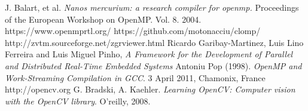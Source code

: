 \documentclass[a4paper,12pt,oneside]{book}
\begin{document}
\begin{thebibliography}{30}
 J. Balart, et al. \emph{Nanos mercurium: a research compiler for openmp.} Proceedings of the European Workshop on OpenMP. Vol. 8. 2004.
https://www.openmprtl.org/
https://github.com/motonacciu/clomp/
http://zvtm.sourceforge.net/zgrviewer.html
 Ricardo Garibay-Martinez, Luis Lino Ferreira and Luis Miguel Pinho, \emph{A Framework for the Development of Parallel and Distributed Real-Time Embedded Systems}
Antoniu Pop (1998). \emph{OpenMP and Work-Streaming Compilation in GCC}. 3 April 2011, Chamonix, France
http://opencv.org
G. Bradski, A. Kaehler. \emph{Learning OpenCV: Computer vision with the OpenCV library}. O'reilly, 2008.

\end{thebibliography}
\end{document}
